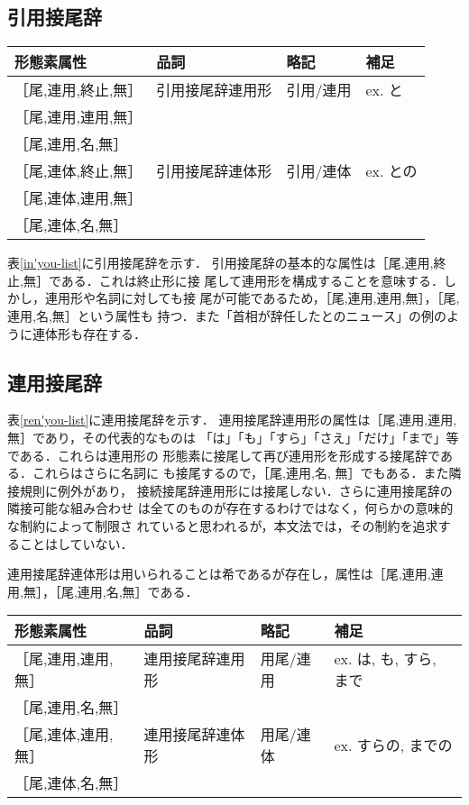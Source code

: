 \subsection{引用接尾辞}
\begin{table*}
\begin{center}
\begin{tabular}{|l|l|l|l|}
\hline
形態素属性 & 品詞 & 略記 & 補足 \\
\hline
［尾,連用,終止,無］ & 引用接尾辞連用形 &  引用/連用 & ex. と \\
［尾,連用,連用,無］ &&&\\
［尾,連用,名,無］ &&&\\ \hline
［尾,連体,終止,無］ & 引用接尾辞連体形 & 引用/連体 & ex. との \\
［尾,連体,連用,無］ &&&\\
［尾,連体,名,無］ &&&\\
\hline
\end{tabular}
\end{center}
\caption{引用接尾辞}
\label{in'you-list}
\end{table*}

表\ref{in'you-list}に引用接尾辞を示す．
引用接尾辞の基本的な属性は［尾,連用,終止,無］である．これは終止形に接
尾して連用形を構成することを意味する．しかし，連用形や名詞に対しても接
尾が可能であるため，［尾,連用,連用,無］，［尾,連用,名,無］という属性も
持つ．また「首相が辞任したとのニュース」の例のように連体形も存在する．

\subsection{連用接尾辞}
表\ref{ren'you-list}に連用接尾辞を示す．
連用接尾辞連用形の属性は［尾,連用,連用,無］であり，その代表的なものは
「は」「も」「すら」「さえ」「だけ」「まで」等である．これらは連用形の
形態素に接尾して再び連用形を形成する接尾辞である．これらはさらに名詞に
も接尾するので，［尾,連用,名, 無］でもある．また隣接規則に例外があり，
接続接尾辞連用形には接尾しない．さらに連用接尾辞の隣接可能な組み合わせ
は全てのものが存在するわけではなく，何らかの意味的な制約によって制限さ
れていると思われるが，本文法では，その制約を追求することはしていない．

連用接尾辞連体形は用いられることは希であるが存在し，属性は［尾,連用,連
用,無］，［尾,連用,名,無］である．

\begin{table*}
\begin{center}
\begin{tabular}{|l|l|l|l|}
\hline
形態素属性 & 品詞 & 略記 & 補足 \\
\hline
［尾,連用,連用,無］ & 連用接尾辞連用形 & 用尾/連用 & ex. は, も, すら, まで \\
［尾,連用,名,無］ &&&\\
\hline
［尾,連体,連用,無］ & 連用接尾辞連体形 & 用尾/連体 & ex. すらの, までの \\
［尾,連体,名,無］ &&&\\
\hline
\end{tabular}
\end{center}
\caption{連用接尾辞}
\label{ren'you-list}
\end{table*}


